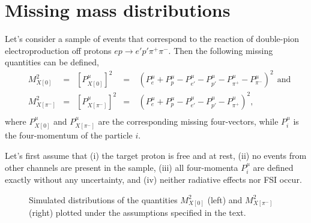 \newpage
\chapter{Missing mass distributions}
\label{ch:mm}
\mbox{}\vspace{-\baselineskip}

Let's consider a sample of events that correspond to the reaction of double-pion electroproduction off protons $ep\rightarrow e'p'\pi^{+}\pi^{-}$. Then the following missing quantities can be defined,
\begin{equation}
\begin{aligned}
&M_{X[0]}^{2}&=&\left [P_{X[0]}^{\mu} \right ]^{2}&=&~\left (P_{e}^{\mu} + P_{p}^{\mu}- P_{e'}^{\mu}- P_{p'}^{\mu}-  P_{\pi^{+}}^{\mu} - P_{\pi^{-}}^{\mu}\right )^{2}~~\textrm{and}\\
&M_{X[\pi^{-}]}^{2}&=&\left [P_{X[\pi^{-}]}^{\mu}\right ]^{2}&=&~\left (P_{e}^{\mu} + P_{p}^{\mu}- P_{e'}^{\mu}- P_{p'}^{\mu}-  P_{\pi^{+}}^{\mu}\right )^{2},\\
\end{aligned}\label{eq:mm_def}
\end{equation}
where $P_{X[0]}^{\mu}$ and $P_{X[\pi^{-}]}^{\mu}$ are the corresponding missing four-vectors, while $P_{i}^{\mu}$ is the four-momentum of the particle $i$.



Let's first assume that (i) the target proton is free and at rest, (ii) no events from other channels are present in the sample, (iii) all four-momenta $P_{i}^{\mu}$ are defined exactly without any uncertainty, and (iv) neither radiative effects nor FSI occur. 

\begin{figure}[htp]
\begin{center}
\caption{\small Simulated distributions of the quantities $M_{X[0]}^{2}$ (left) and $M_{X[\pi^{-}]}^{2}$ (right) plotted under the assumptions specified in the text.} \label{fig:norad_nofsi}
\end{center}
\end{figure}


